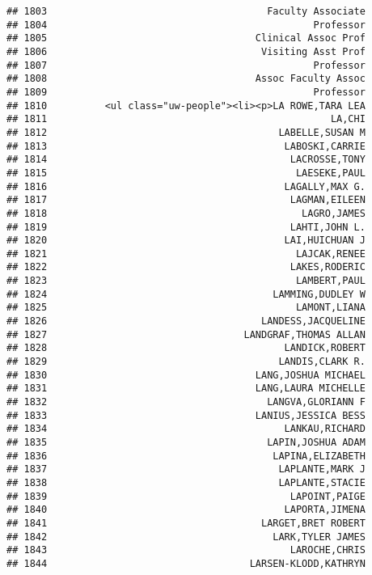 \documentclass[
]{article}
\begin{document}
\begin{verbatim}
## 1803                                      Faculty Associate
## 1804                                              Professor
## 1805                                    Clinical Assoc Prof
## 1806                                     Visiting Asst Prof
## 1807                                              Professor
## 1808                                    Assoc Faculty Assoc
## 1809                                              Professor
## 1810          <ul class="uw-people"><li><p>LA ROWE,TARA LEA
## 1811                                                 LA,CHI
## 1812                                        LABELLE,SUSAN M
## 1813                                         LABOSKI,CARRIE
## 1814                                          LACROSSE,TONY
## 1815                                           LAESEKE,PAUL
## 1816                                         LAGALLY,MAX G.
## 1817                                          LAGMAN,EILEEN
## 1818                                            LAGRO,JAMES
## 1819                                          LAHTI,JOHN L.
## 1820                                         LAI,HUICHUAN J
## 1821                                           LAJCAK,RENEE
## 1822                                          LAKES,RODERIC
## 1823                                           LAMBERT,PAUL
## 1824                                       LAMMING,DUDLEY W
## 1825                                           LAMONT,LIANA
## 1826                                     LANDESS,JACQUELINE
## 1827                                  LANDGRAF,THOMAS ALLAN
## 1828                                         LANDICK,ROBERT
## 1829                                        LANDIS,CLARK R.
## 1830                                    LANG,JOSHUA MICHAEL
## 1831                                    LANG,LAURA MICHELLE
## 1832                                      LANGVA,GLORIANN F
## 1833                                    LANIUS,JESSICA BESS
## 1834                                         LANKAU,RICHARD
## 1835                                      LAPIN,JOSHUA ADAM
## 1836                                       LAPINA,ELIZABETH
## 1837                                        LAPLANTE,MARK J
## 1838                                        LAPLANTE,STACIE
## 1839                                          LAPOINT,PAIGE
## 1840                                         LAPORTA,JIMENA
## 1841                                     LARGET,BRET ROBERT
## 1842                                       LARK,TYLER JAMES
## 1843                                          LAROCHE,CHRIS
## 1844                                   LARSEN-KLODD,KATHRYN

\end{verbatim}
\end{document}
